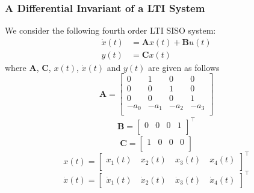 \documentclass{article}
\begin{document}
\subsubsection{A Differential Invariant of a LTI System}\label{differential-invariant}
We consider the following fourth order LTI SISO system:
\begin{equation}\label{eqn.42a}
\begin{split}
	\dot{x}(t) &= \mathbf{A}x(t)+\mathbf{B}u(t)\\
	y(t) &= \mathbf{C}x(t)
\end{split}
\end{equation}
where $\mathbf{A}$, $\mathbf{C}$, $x(t)$, $\dot{x}(t)$ and $y(t)$ are given as follows 
\begin{equation*}\label{eqn.42b}
	\mathbf{A} = \begin{bmatrix}
	0 & 1 & 0 & 0\\[0.3em]
	0 & 0 & 1 & 0\\[0.3em]
	0 & 0 & 0 & 1\\[0.3em]
	-a_0 & -a_1 & -a_2 & -a_3\\[0.3em]
	\end{bmatrix}
\end{equation*}
\begin{equation*}
\begin{split}
	\mathbf{B} = \begin{bmatrix}
	0 & 0 & 0 & 1 \\[0.3em]
	\end{bmatrix}^\intercal
\end{split}
\end{equation*}
\begin{equation*}\label{eqn.42c}
	\mathbf{C} = \begin{bmatrix}
	1 & 0 & 0 & 0 \\[0.3em]
\end{bmatrix}
\end{equation*}
\begin{equation*}\label{eqn.42d}
	x(t) = \begin{bmatrix}
	x_{1}(t)\quad x_{2}(t)\quad x_{3}(t)\quad x_{4}(t) \\[0.3em]
	\end{bmatrix}^\intercal
\end{equation*}
\begin{equation*}\label{eqn.42e}
	\dot{x}(t) = \begin{bmatrix}
	\dot{x}_{1}(t)\quad\dot{x}_{2}(t)\quad\dot{x}_{3}(t)\quad\dot{x}_{4}(t)\end{bmatrix}^\intercal
\end{equation*}
\end{document}
